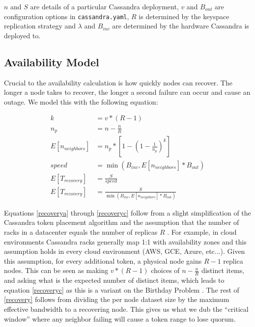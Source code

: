 \documentclass{article}
\begin{document}
$n$ and $S$ are details of a particular Cassandra deployment, $v$ and $B_{out}$
are configuration options in \texttt{cassandra.yaml}, $R$ is determined by the
keyspace replication strategy and $\lambda$ and $B_{inc}$ are determined by the
hardware Cassandra is deployed to.

\subsection{Availability Model}

Crucial to the availability calculation is how quickly nodes can recover. The
longer a node takes to recover, the longer a second failure can occur and cause
an outage. We model this with the following equation:

\begin{subequations} \label{recovery}
    \begin{align}
        k & = v * (R - 1) \\ \label{recoverya}
        n_{p} & = n - \frac{n}{R} \\
        E[n_{neighbors}] & = n_{p} * [1 - (1-\frac{1}{n_{p}})^k] \label{recoveryc} \\
        speed & = \min(B_{inc}, E[n_{neighbors}] * B_{out}) \\
        E[T_{recovery}] & = \frac{S}{speed} \\
        E[T_{recovery}] & = \frac{S}{\min(B_{inc}, E[n_{neighbors}] * B_{out})}
    \end{align}
\end{subequations}

Equations \ref{recoverya} through \ref{recoveryc} follow from a slight
simplification of the Cassandra token placement algorithm and the assumption
that the number of racks in a datacenter equals the number of replicas $R$
\cite{replication}. For example, in cloud environments Cassandra racks
generally map 1:1 with availability zones and this assumption holds in every
cloud environment (AWS, GCE, Azure, etc...). Given this assumption, for every
additional token, a physical node gains $R - 1$ replica nodes. This can be seen
as making $v * (R - 1)$ choices of $n - \frac{n}{R}$ distinct items, and asking
what is the expected number of distinct items, which leads to equation
\ref{recoveryc} as this is a variant on the Birthday Problem \cite{neighbors}.
The rest of \ref{recovery} follows from dividing the per node dataset size by
the maximum effective bandwidth to a recovering node. This gives us what we dub
the ``critical window'' where any neighbor failing will cause a token range to
lose quorum.
\end{document}
